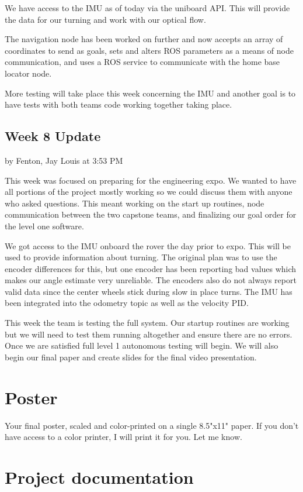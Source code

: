 \documentclass[10pt, oneside,onecolumn]{IEEEtran}
\begin{document}
We have access to the IMU as of today via the uniboard API. This will provide the data for our turning and work with our optical flow. 

The navigation node has been worked on further and now accepts an array of coordinates to send as goals, sets and alters ROS parameters as a means of node communication, and uses a ROS service to communicate with the home base locator node. 

More testing will take place this week concerning the IMU and another goal is to have tests with both teams code working together taking place.

\subsection{Week 8 Update}
by Fenton, Jay Louis at 3:53 PM

This week was focused on preparing for the engineering expo. We wanted to have all portions of the project mostly working so we could discuss them with anyone who asked questions. This meant working on the start up routines, node communication between the two capstone teams, and finalizing our goal order for the level one software. 

We got access to the IMU onboard the rover the day prior to expo. This will be used to provide information about turning. The original plan was to use the encoder differences for this, but one encoder has been reporting bad values which makes our angle estimate very unreliable. The encoders also do not always report valid data since the center wheels stick during slow in place turns. The IMU has been integrated into the odometry topic as well as the velocity PID. 

This week the team is testing the full system. Our startup routines are working but we will need to test them running altogether and ensure there are no errors. Once we are satisfied full level 1 autonomous testing will begin. We will also begin our final paper and create slides for the final video presentation. 

\section{Poster}

Your final poster, scaled and color-printed on a single 8.5"x11" paper. If you don't have access to a color printer, I will print it for you. Let me know.

\section{Project documentation}
\end{document}

